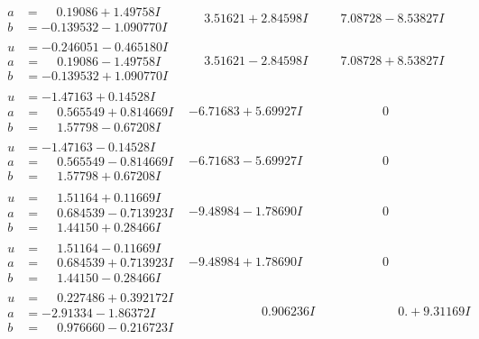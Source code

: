 \documentclass[1p]{elsarticle_modified}
\theoremstyle{definition}
\begin{document}
$$\begin{array}{c|c|c}
\begin{aligned}
a &= \phantom{-}0.19086 + 1.49758 I \\
b &= -0.139532 - 1.090770 I\end{aligned}
 & \phantom{-}3.51621 + 2.84598 I & \phantom{-}7.08728 - 8.53827 I \\ \hline\begin{aligned}
u &= -0.246051 - 0.465180 I \\
a &= \phantom{-}0.19086 - 1.49758 I \\
b &= -0.139532 + 1.090770 I\end{aligned}
 & \phantom{-}3.51621 - 2.84598 I & \phantom{-}7.08728 + 8.53827 I \\ \hline\begin{aligned}
u &= -1.47163 + 0.14528 I \\
a &= \phantom{-}0.565549 + 0.814669 I \\
b &= \phantom{-}1.57798 - 0.67208 I\end{aligned}
 & -6.71683 + 5.69927 I & \phantom{-0.000000 } 0 \\ \hline\begin{aligned}
u &= -1.47163 - 0.14528 I \\
a &= \phantom{-}0.565549 - 0.814669 I \\
b &= \phantom{-}1.57798 + 0.67208 I\end{aligned}
 & -6.71683 - 5.69927 I & \phantom{-0.000000 } 0 \\ \hline\begin{aligned}
u &= \phantom{-}1.51164 + 0.11669 I \\
a &= \phantom{-}0.684539 - 0.713923 I \\
b &= \phantom{-}1.44150 + 0.28466 I\end{aligned}
 & -9.48984 - 1.78690 I & \phantom{-0.000000 } 0 \\ \hline\begin{aligned}
u &= \phantom{-}1.51164 - 0.11669 I \\
a &= \phantom{-}0.684539 + 0.713923 I \\
b &= \phantom{-}1.44150 - 0.28466 I\end{aligned}
 & -9.48984 + 1.78690 I & \phantom{-0.000000 } 0 \\ \hline\begin{aligned}
u &= \phantom{-}0.227486 + 0.392172 I \\
a &= -2.91334 - 1.86372 I \\
b &= \phantom{-}0.976660 - 0.216723 I\end{aligned}
 & \phantom{-0.000000 -}0.906236 I & \phantom{-0.000000 -}0. + 9.31169 I\\

\end{array}$$
\end{document}
